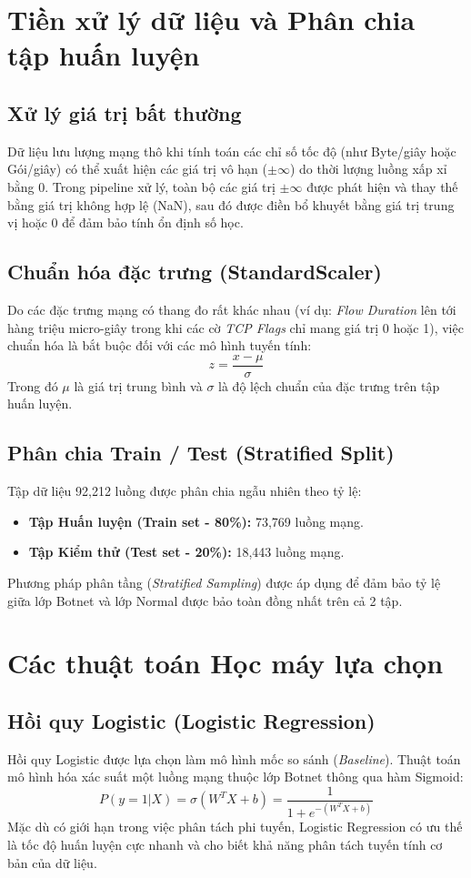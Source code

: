 \documentclass[12pt,a4paper,oneside]{report}
\begin{document}
\section{Tiền xử lý dữ liệu và Phân chia tập huấn luyện}
\subsection{Xử lý giá trị bất thường}
Dữ liệu lưu lượng mạng thô khi tính toán các chỉ số tốc độ (như Byte/giây hoặc Gói/giây) có thể xuất hiện các giá trị vô hạn ($\pm \infty$) do thời lượng luồng xấp xỉ bằng 0. Trong pipeline xử lý, toàn bộ các giá trị $\pm \infty$ được phát hiện và thay thế bằng giá trị không hợp lệ (NaN), sau đó được điền bổ khuyết bằng giá trị trung vị hoặc 0 để đảm bảo tính ổn định số học.

\subsection{Chuẩn hóa đặc trưng (StandardScaler)}
Do các đặc trưng mạng có thang đo rất khác nhau (ví dụ: \textit{Flow Duration} lên tới hàng triệu micro-giây trong khi các cờ \textit{TCP Flags} chỉ mang giá trị 0 hoặc 1), việc chuẩn hóa là bắt buộc đối với các mô hình tuyến tính:
\begin{equation}
  z = \frac{x - \mu}{\sigma}
\end{equation}
Trong đó $\mu$ là giá trị trung bình và $\sigma$ là độ lệch chuẩn của đặc trưng trên tập huấn luyện.

\subsection{Phân chia Train / Test (Stratified Split)}
Tập dữ liệu 92,212 luồng được phân chia ngẫu nhiên theo tỷ lệ:
\begin{itemize}
  \item \textbf{Tập Huấn luyện (Train set - 80\%):} 73,769 luồng mạng.
  \item \textbf{Tập Kiểm thử (Test set - 20\%):} 18,443 luồng mạng.
\end{itemize}
Phương pháp phân tầng (\textit{Stratified Sampling}) được áp dụng để đảm bảo tỷ lệ giữa lớp Botnet và lớp Normal được bảo toàn đồng nhất trên cả 2 tập.

\section{Các thuật toán Học máy lựa chọn}
\subsection{Hồi quy Logistic (Logistic Regression)}
Hồi quy Logistic được lựa chọn làm mô hình mốc so sánh (\textit{Baseline}). Thuật toán mô hình hóa xác suất một luồng mạng thuộc lớp Botnet thông qua hàm Sigmoid:
\begin{equation}
  P(y=1 | X) = \sigma(W^T X + b) = \frac{1}{1 + e^{-(W^T X + b)}}
\end{equation}
Mặc dù có giới hạn trong việc phân tách phi tuyến, Logistic Regression có ưu thế là tốc độ huấn luyện cực nhanh và cho biết khả năng phân tách tuyến tính cơ bản của dữ liệu.
\end{document}

